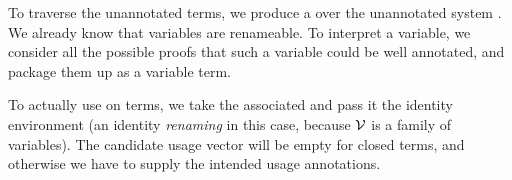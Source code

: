 
To traverse the unannotated terms, we produce a  over the
unannotated system \AgdaSpace{}.
We already know that variables are renameable.
To interpret a variable, we consider all the possible proofs that such a
variable could be well annotated, and package them up as a variable term.



To actually use  on terms, we take the associated
 and pass it the identity environment (an identity
\emph{renaming} in this case, because $\mathcal V$ is a family of variables).
The candidate usage vector  will be empty for closed terms, and
otherwise we have to supply the intended usage annotations.
